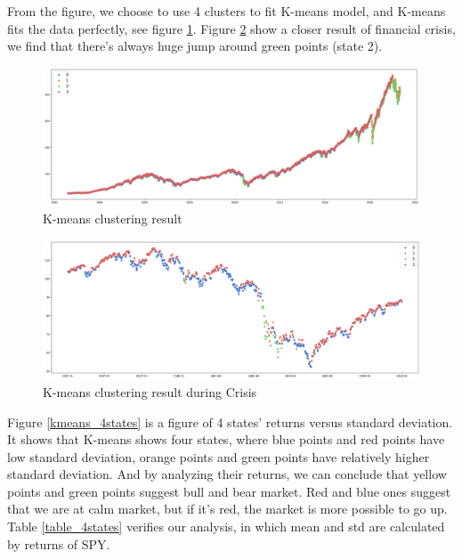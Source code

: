 \documentclass[a4paper,12pt]{article}
\begin{document}
From the figure, we choose to use 4 clusters to fit K-means model, and K-means fits the data perfectly, see figure \ref{kmeans_all}. Figure \ref{kmeans_2008} show a closer result of financial crisis, we find that there's always huge jump around green points (state 2).

\begin{figure}[H]
    \includegraphics[scale=0.3]{kmeans_all.png}
    \caption{K-means clustering result}\label{kmeans_all}
\end{figure}

\begin{figure}[H]
    \includegraphics[scale=0.3]{kmeans_2008.png}
    \caption{K-means clustering result during Crisis}\label{kmeans_2008}
\end{figure}

Figure \ref{kmeans_4states} is a figure of 4 states' returns versus standard deviation. It shows that K-means shows four states, where blue points and red points have low standard deviation, orange points and green points have relatively higher standard deviation. And by analyzing their returns, we can conclude that yellow points and green points suggest bull and bear market. Red and blue ones suggest that we are at calm market, but if it's red, the market is more possible to go up. Table \ref{table_4states} verifies our analysis, in which mean and std are calculated by returns of SPY.
\end{document}

